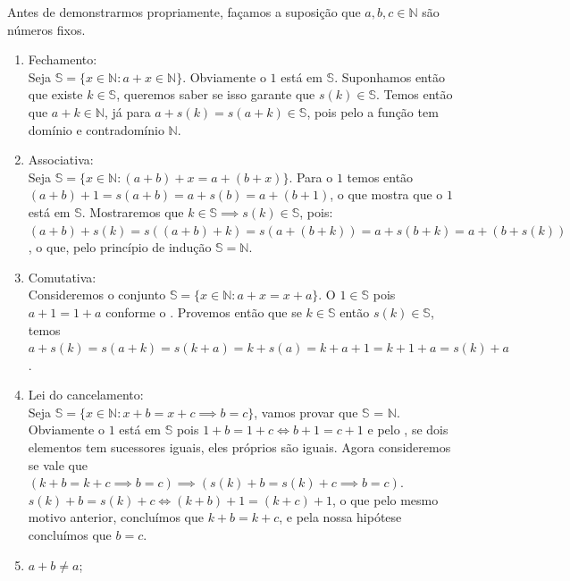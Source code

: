 \documentclass[../main.tex]{subfiles}
\begin{document}
\begin{dem}
    Antes de demonstrarmos propriamente, façamos a suposição que $a,b,c \in \mathbb{N}$ são números fixos.
    \begin{enumerate}[label=(\roman*)]    
        \item Fechamento: \\
            Seja $\mathbb{S} = \{ x \in \mathbb{N} : a + x \in \mathbb{N} \}$. Obviamente o $1$ está em $\mathbb{S}$. Suponhamos então que existe $k \in \mathbb{S}$, queremos saber se isso garante que $s(k) \in \mathbb{S}$. Temos então que $a + k \in \mathbb{N}$, já para $a + s(k) = s(a + k) \in \mathbb{S}$, pois pelo  a função tem domínio e contradomínio $\mathbb{N}$.
        \item Associativa: \\
             Seja $\mathbb{S} = \{ x \in \mathbb{N} : (a + b) + x = a + (b + x) \}$. Para o $1$ temos então
             $(a + b) + 1 = s(a + b) = a + s(b) = a + (b + 1)$, o que mostra que o $1$ está em $\mathbb{S}$. 
             Mostraremos que $k \in \mathbb{S} \implies s(k) \in \mathbb{S}$, pois:
             $(a + b) + s(k) = s( (a + b) + k) = s(a + (b + k)) = a + s(b + k) = a + (b + s(k))$, o que, pelo princípio de indução $\mathbb{S} = \mathbb{N}$.
        \item Comutativa: \\
            Consideremos o conjunto $\mathbb{S} = \{ x \in \mathbb{N} : a + x = x + a\}$. O $1 \in \mathbb{S}$ pois 
            $a + 1 = 1 + a$ conforme o .
            Provemos então que se $k \in \mathbb{S}$ então $s(k) \in \mathbb{S}$, temos 
            $a + s(k) = s(a + k) = s(k + a) = k + s(a) = k + a + 1 = k + 1 + a = s(k) + a$.
        \item Lei do cancelamento: \\
            Seja $\mathbb{S} = \{ x \in \mathbb{N} : x + b = x + c \implies b = c \}$, vamos provar que $\mathbb{S}$ = $\mathbb{N}$. Obviamente o $1$ está em $\mathbb{S}$ pois $1 + b = 1 + c \iff b + 1 = c + 1$ e pelo , se dois elementos tem sucessores iguais, eles próprios são iguais. Agora consideremos se vale que $(k + b = k + c \implies b = c) \implies (s(k) + b = s(k) + c \implies b = c)$. \\
            $s(k) + b = s(k) + c \iff (k + b) + 1 = (k + c) + 1$, o que pelo mesmo motivo anterior, concluímos que $k + b = k + c$, e pela nossa hipótese concluímos que $b = c$.
        \item $a + b \neq a$;\\

\end{enumerate}
\end{dem}
\end{document}
